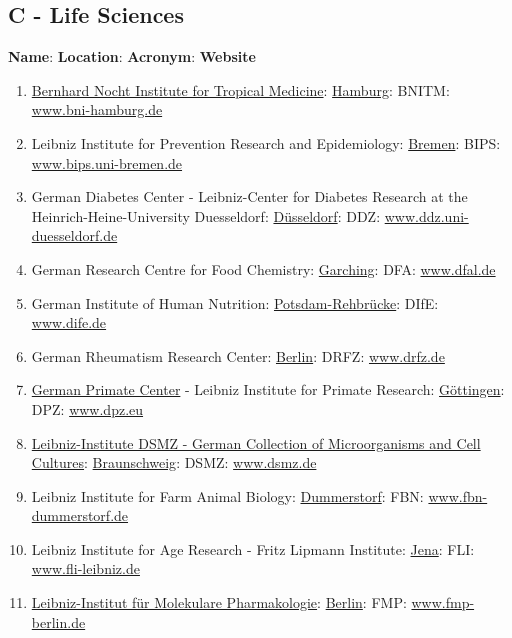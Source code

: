 \documentclass{book}
\numberwithin{equation}{section}
\begin{document}
\subsection{C - Life Sciences}
\textbf{Name}: \textbf{Location}: \textbf{Acronym}: \textbf{Website}
\begin{enumerate}
    \item \href{https://en.wikipedia.org/wiki/Bernhard_Nocht_Institute_for_Tropical_Medicine}{Bernhard Nocht Institute for Tropical Medicine}: \href{https://en.wikipedia.org/wiki/Hamburg}{Hamburg}: BNITM: \url{www.bni-hamburg.de}
    \item Leibniz Institute for Prevention Research and Epidemiology: \href{https://en.wikipedia.org/wiki/Bremen}{Bremen}: BIPS: \url{www.bips.uni-bremen.de}
    \item German Diabetes Center - Leibniz-Center for Diabetes Research at the Heinrich-Heine-University Duesseldorf: \href{https://en.wikipedia.org/wiki/D%C3%BCsseldorf}{Düsseldorf}: DDZ: \url{www.ddz.uni-duesseldorf.de}
    \item German Research Centre for Food Chemistry: \href{https://en.wikipedia.org/wiki/Garching}{Garching}: DFA: \url{www.dfal.de}
    \item German Institute of Human Nutrition: \href{https://en.wikipedia.org/wiki/Potsdam}{Potsdam-Rehbrücke}: DIfE: \url{www.dife.de}
    \item German Rheumatism Research Center: \href{https://en.wikipedia.org/wiki/Berlin}{Berlin}: DRFZ: \url{www.drfz.de}
    \item \href{https://en.wikipedia.org/wiki/German_Primate_Center}{German Primate Center} - Leibniz Institute for Primate Research: \href{https://en.wikipedia.org/wiki/G%C3%B6ttingen}{Göttingen}: DPZ: \url{www.dpz.eu}
    \item \href{https://en.wikipedia.org/wiki/Deutsche_Sammlung_von_Mikroorganismen_und_Zellkulturen}{Leibniz-Institute DSMZ - German Collection of Microorganisms and Cell Cultures}: \href{https://en.wikipedia.org/wiki/Braunschweig}{Braunschweig}: DSMZ: \url{www.dsmz.de}
    \item Leibniz Institute for Farm Animal Biology: \href{https://en.wikipedia.org/wiki/Dummerstorf}{Dummerstorf}: FBN: \url{www.fbn-dummerstorf.de}
    \item Leibniz Institute for Age Research - Fritz Lipmann Institute: \href{https://en.wikipedia.org/wiki/Jena}{Jena}: FLI: \url{www.fli-leibniz.de}
    \item \href{https://en.wikipedia.org/wiki/Leibniz-Institut_f%C3%BCr_Molekulare_Pharmakologie}{Leibniz-Institut für Molekulare Pharmakologie}: \href{https://en.wikipedia.org/wiki/Berlin}{Berlin}: FMP: \url{www.fmp-berlin.de}

\end{enumerate}
\end{document}
